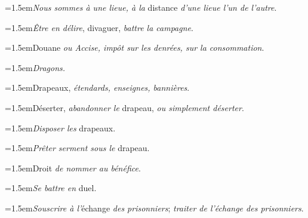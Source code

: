 \par{\dictfontsize\hangindent=1.5em\noindent \textit{Nous sommes à une lieue, à la} distance \textit{d’une lieue l’un de l’autre}. \par}
\par{\dictfontsize\hangindent=1.5em\noindent \textit{Être en délire}, divaguer, \textit{battre la campagne}. \par}
\par{\dictfontsize\hangindent=1.5em\noindent Douane \textit{ou Accise, impôt sur les denrées, sur la consommation}. \par}
\par{\dictfontsize\hangindent=1.5em\noindent \textit{Dragons.} \par}
\par{\dictfontsize\hangindent=1.5em\noindent Drapeaux, \textit{étendards, enseignes, bannières}. \par}
\par{\dictfontsize\hangindent=1.5em\noindent Déserter, \textit{abandonner le} drapeau, \textit{ou simplement déserter}. \par}
\par{\dictfontsize\hangindent=1.5em\noindent \textit{Disposer les} drapeaux. \par}
\par{\dictfontsize\hangindent=1.5em\noindent \textit{Prêter serment sous le} drapeau. \par}
\par{\dictfontsize\hangindent=1.5em\noindent Droit \textit{de nommer au bénéfice}. \par}
\par{\dictfontsize\hangindent=1.5em\noindent \textit{Se battre en} duel. \par}
\par{\dictfontsize\hangindent=0pt\noindent{}\par}
\par{\dictfontsize\hangindent=1.5em\noindent \textit{Souscrire à l’}échange \textit{des prisonniers}; \textit{traiter de l’échange des prisonniers}. \par}
